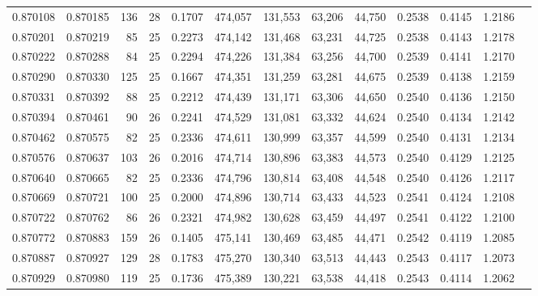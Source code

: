 \begin{tabular}{rrrrrrrrrrrrr}
0.870108 & 0.870185 &   136 &  28 &                                     0.1707 & 474,057 & 131,553 &  63,206 &  44,750 & 0.2538 & 0.4145 & 1.2186 \\
0.870201 & 0.870219 &    85 &  25 &                                     0.2273 & 474,142 & 131,468 &  63,231 &  44,725 & 0.2538 & 0.4143 & 1.2178 \\
0.870222 & 0.870288 &    84 &  25 &                                     0.2294 & 474,226 & 131,384 &  63,256 &  44,700 & 0.2539 & 0.4141 & 1.2170 \\
0.870290 & 0.870330 &   125 &  25 &                                     0.1667 & 474,351 & 131,259 &  63,281 &  44,675 & 0.2539 & 0.4138 & 1.2159 \\
0.870331 & 0.870392 &    88 &  25 &                                     0.2212 & 474,439 & 131,171 &  63,306 &  44,650 & 0.2540 & 0.4136 & 1.2150 \\
0.870394 & 0.870461 &    90 &  26 &                                     0.2241 & 474,529 & 131,081 &  63,332 &  44,624 & 0.2540 & 0.4134 & 1.2142 \\
0.870462 & 0.870575 &    82 &  25 &                                     0.2336 & 474,611 & 130,999 &  63,357 &  44,599 & 0.2540 & 0.4131 & 1.2134 \\
0.870576 & 0.870637 &   103 &  26 &                                     0.2016 & 474,714 & 130,896 &  63,383 &  44,573 & 0.2540 & 0.4129 & 1.2125 \\
0.870640 & 0.870665 &    82 &  25 &                                     0.2336 & 474,796 & 130,814 &  63,408 &  44,548 & 0.2540 & 0.4126 & 1.2117 \\
0.870669 & 0.870721 &   100 &  25 &                                     0.2000 & 474,896 & 130,714 &  63,433 &  44,523 & 0.2541 & 0.4124 & 1.2108 \\
0.870722 & 0.870762 &    86 &  26 &                                     0.2321 & 474,982 & 130,628 &  63,459 &  44,497 & 0.2541 & 0.4122 & 1.2100 \\
0.870772 & 0.870883 &   159 &  26 &                                     0.1405 & 475,141 & 130,469 &  63,485 &  44,471 & 0.2542 & 0.4119 & 1.2085 \\
0.870887 & 0.870927 &   129 &  28 &                                     0.1783 & 475,270 & 130,340 &  63,513 &  44,443 & 0.2543 & 0.4117 & 1.2073 \\
0.870929 & 0.870980 &   119 &  25 &                                     0.1736 & 475,389 & 130,221 &  63,538 &  44,418 & 0.2543 & 0.4114 & 1.2062 \\

\end{tabular}
